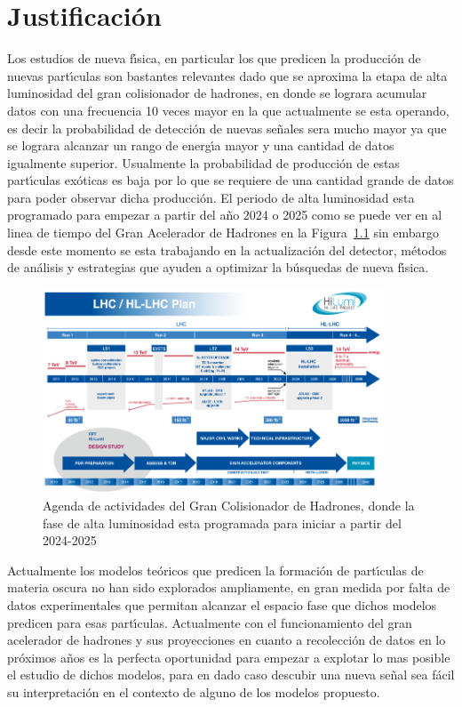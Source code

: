 \chapter{Justificaci\'on}

Los estudios de nueva f\'{\i}sica, en particular los que predicen la producci\'on de nuevas part\'{\i}culas son bastantes relevantes dado que se aproxima la etapa de alta luminosidad del gran colisionador de hadrones, en donde se lograra acumular datos con una frecuencia 10 veces mayor en la que actualmente se esta operando, es decir la probabilidad de detecci\'on de nuevas se\~nales sera mucho mayor ya que se lograra alcanzar un rango de energ\'{\i}a mayor y una cantidad de datos igualmente superior. Usualmente la probabilidad de producci\'on de estas part\'{\i}culas ex\'oticas es baja por lo que se requiere de una cantidad grande de datos para poder observar dicha producci\'on. El periodo de alta luminosidad esta programado para empezar a partir del a\~no 2024 o 2025 como se puede ver en al linea de tiempo del Gran Acelerador de Hadrones en la Figura~\ref{fig:lhctimeline} sin embargo desde este momento se esta trabajando en la actualizaci\'on del detector, m\'etodos de an\'alisis y estrategias que ayuden a optimizar la b\'usquedas de nueva f\'{\i}sica. 

\begin{figure}
\begin{center}
  \includegraphics[width=4.0in]{lhc_timeline.png}
  \caption{Agenda de actividades del Gran Colisionador de Hadrones, donde la fase de alta luminosidad esta programada para iniciar a partir del 2024-2025}
  \label{fig:lhctimeline}
\end{center}
\end{figure}


Actualmente los modelos te\'oricos que predicen la formaci\'on de part\'{\i}culas de materia oscura no han sido explorados ampliamente, en gran medida por falta de datos experimentales que permitan alcanzar el espacio fase que dichos modelos predicen para esas part\'{\i}culas.  Actualmente con el funcionamiento del gran acelerador de hadrones y sus proyecciones en cuanto a recolecci\'on de datos en lo pr\'oximos a\~nos es la perfecta oportunidad para empezar a explotar lo mas posible el estudio de dichos modelos, para en dado caso descubir una nueva se\~nal sea f\'acil su interpretaci\'on en el contexto de alguno de los modelos propuesto.


